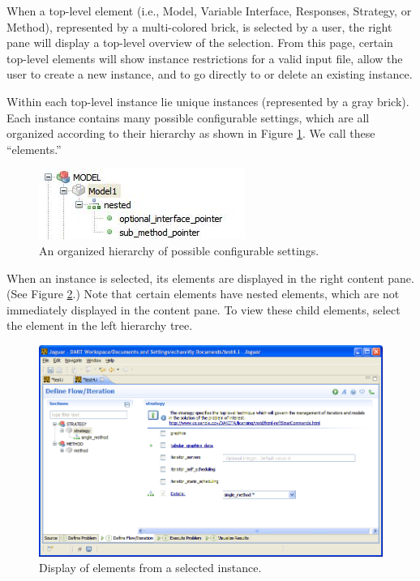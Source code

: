 When a top-level element (i.e., Model, Variable Interface, Responses,
Strategy, or Method), represented by a multi-colored brick, is
selected by a user, the right pane will display a top-level overview
of the selection.  From this page, certain top-level elements will
show instance restrictions for a valid input file, allow the user to
create a new instance, and to go directly to or delete an existing
instance.

Within each top-level instance lie unique instances (represented by a
gray brick).  Each instance contains many possible configurable
settings, which are all organized according to their hierarchy as
shown in Figure \ref{fig:input:jag_graphical3}.  We call these
``elements.''
\begin{figure}
  \centering
  \includegraphics[scale=0.8]{images/jag_graphical3}
  \caption{An organized hierarchy of possible configurable settings.}
  \label{fig:input:jag_graphical3}
\end{figure}

When an instance is selected, its elements are displayed in the right
content pane. (See Figure \ref{fig:input:jag_graphical4}.)  Note that
certain elements have nested elements, which are not immediately
displayed in the content pane.  To view these child elements, select
the element in the left hierarchy tree.
\begin{figure}
  \centering
  \includegraphics[scale=0.4]{images/jag_graphical4}
  \caption{Display of elements from a selected instance.}
  \label{fig:input:jag_graphical4}
\end{figure}

